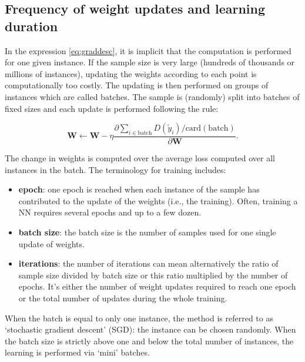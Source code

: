 \documentclass[]{krantz}
\providecommand{\tightlist}{%
  \setlength{\itemsep}{0pt}\setlength{\parskip}{0pt}}
\theoremstyle{definition}
\theoremstyle{definition}
\theoremstyle{definition}
\theoremstyle{remark}
\begin{document}
\hypertarget{frequency-of-weight-updates-and-learning-duration}{%
\subsection{Frequency of weight updates and learning
duration}\label{frequency-of-weight-updates-and-learning-duration}}

In the expression \eqref{eq:graddesc}, it is implicit that the computation
is performed for one given instance. If the sample size is very large
(hundreds of thousands or millions of instances), updating the weights
according to each point is computationally too costly. The updating is
then performed on groups of instances which are called batches. The
sample is (randomly) split into batches of fixed sizes and each update
is performed following the rule:

\begin{equation}
\label{eq:gradbatch}
\textbf{W} \leftarrow \textbf{W}-\eta  \frac{\partial \sum_{i \in \text{batch}} D(\tilde{y}_i)/\text{card}(\text{batch}) }{\partial \textbf{W}}.
\end{equation}

The change in weights is computed over the average loss computed over
all instances in the batch. The terminology for training includes:

\begin{itemize}
\tightlist
\item
  \textbf{epoch}: one epoch is reached when each instance of the sample
  has contributed to the update of the weights (i.e., the training).
  Often, training a NN requires several epochs and up to a few dozen.
\item
  \textbf{batch size}: the batch size is the number of samples used for
  one single update of weights.
\item
  \textbf{iterations}: the number of iterations can mean alternatively
  the ratio of sample size divided by batch size or this ratio
  multiplied by the number of epochs. It's either the number of weight
  updates required to reach one epoch or the total number of updates
  during the whole training.
\end{itemize}

When the batch is equal to only one instance, the method is referred to
as `stochastic gradient descent' (SGD): the instance can be chosen
randomly. When the batch size is strictly above one and below the total
number of instances, the learning is performed via `mini' batches.
\end{document}
